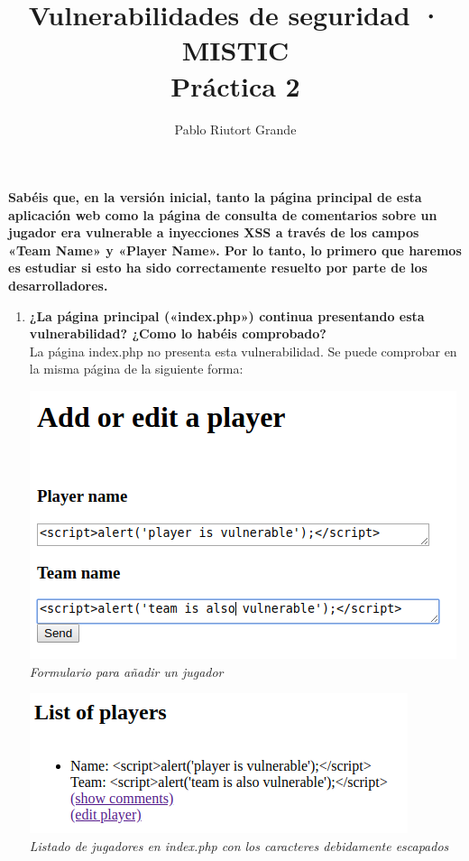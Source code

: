 \documentclass[10pt,a4paper]{article}
\author{Pablo Riutort Grande}
\title{Vulnerabilidades de seguridad · MISTIC\\ \vspace{1cm}\textbf{Práctica 2}}
\begin{document}
\maketitle
\newpage

\section{}
\textbf{Sabéis que, en la versión inicial, tanto la página principal de esta aplicación web como la
página de consulta de comentarios sobre un jugador era vulnerable a inyecciones XSS a
través de los campos «Team Name» y «Player Name». Por lo tanto, lo primero que haremos
es estudiar si esto ha sido correctamente resuelto por parte de los desarrolladores.}

\begin{enumerate}
\item \textbf{¿La página principal («index.php») continua presentando esta vulnerabilidad? ¿Como
lo habéis comprobado?}\\
La página index.php no presenta esta vulnerabilidad. Se puede comprobar en la misma página de la siguiente forma:

\begin{center}
\includegraphics[scale=0.6]{player.png}\\
\textit{Formulario para añadir un jugador}
\end{center}

\begin{center}
\includegraphics[scale=0.6]{player2.png}\\
\textit{Listado de jugadores en index.php con los caracteres debidamente escapados}
\end{center}


\end{enumerate}
\end{document}
